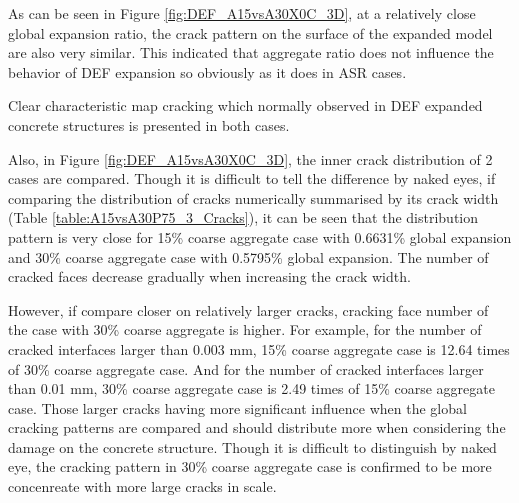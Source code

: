As can be seen in Figure \ref{fig:DEF_A15vsA30X0C_3D}, at a relatively close global expansion ratio, the crack pattern on the surface of the expanded model are also very similar. This indicated that aggregate ratio does not influence the behavior of DEF expansion so obviously as it does in ASR cases.

Clear characteristic map cracking which normally observed in DEF expanded concrete structures is presented in both cases.

Also, in Figure \ref{fig:DEF_A15vsA30X0C_3D}, the inner crack distribution of 2 cases are compared. Though it is difficult to tell the difference by naked eyes, if comparing the distribution of cracks numerically summarised by its crack width (Table \ref{table:A15vsA30P75_3_Cracks}),  it can be seen that the distribution pattern is very close for 15\% coarse aggregate case with 0.6631\% global expansion and  30\% coarse aggregate case with 0.5795\% global expansion. The number of cracked faces decrease gradually when increasing the crack width.

However, if compare closer on relatively larger cracks, cracking face number of the case with 30\% coarse aggregate is higher. For example, for the number of cracked interfaces larger than 0.003 mm, 15\% coarse aggregate case is 12.64 times of 30\% coarse aggregate case. And for the number of cracked interfaces larger than 0.01 mm, 30\% coarse aggregate case is 2.49 times of 15\% coarse aggregate case.  Those larger cracks having more significant influence when the global cracking patterns are compared and should distribute more when considering the damage on the concrete structure. Though it is difficult to distinguish by naked eye, the cracking pattern in 30\% coarse aggregate case is confirmed to be more concenreate with more large cracks in scale.
